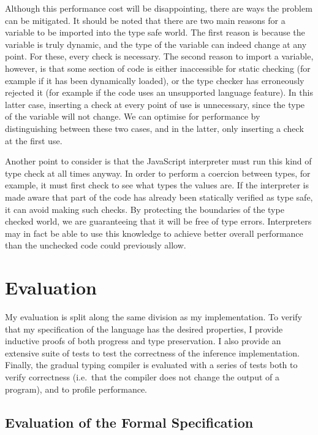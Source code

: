 \documentclass[12pt,a4paper,twoside,openright]{report}
\theoremstyle{definition}
\theoremstyle{dotless}
\begin{document}
Although this performance cost will be disappointing, there are ways the
problem can be mitigated. It should be noted that there are two main reasons
for a variable to be imported into the type safe world. The first reason is
because the variable is truly dynamic, and the type of the variable can indeed
change at any point. For these, every check is necessary. The second reason to
import a variable, however, is that some section of code is either inaccessible
for static checking (for example if it has been dynamically loaded), or the
type checker has erroneously rejected it (for example if the code uses an
unsupported language feature). In this latter case, inserting a check at every
point of use is unnecessary, since the type of the variable will not change. We
can optimise for performance by distinguishing between these two cases, and in
the latter, only inserting a check at the first use.

Another point to consider is that the JavaScript interpreter must run this kind
of type check at all times anyway. In order to perform a coercion between
types, for example, it must first check to see what types the values are. If
the interpreter is made aware that part of the code has already been statically
verified as type safe, it can avoid making such checks. By protecting the
boundaries of the type checked world, we are guaranteeing that it will be free
of type errors. Interpreters may in fact be able to use this knowledge to
achieve better overall performance than the unchecked code could previously
allow.







\chapter{Evaluation}\label{evaluation}

My evaluation is split along the same division as my implementation. To verify
that my specification of the language has the desired properties, I provide
inductive proofs of both progress and type preservation.  I also provide an
extensive suite of tests to test the correctness of the inference
implementation. Finally, the gradual typing compiler is evaluated with a series
of tests both to verify correctness (i.e.~that the compiler does not change the
output of a program), and to profile performance.

\section{Evaluation of the Formal Specification}
\end{document}

